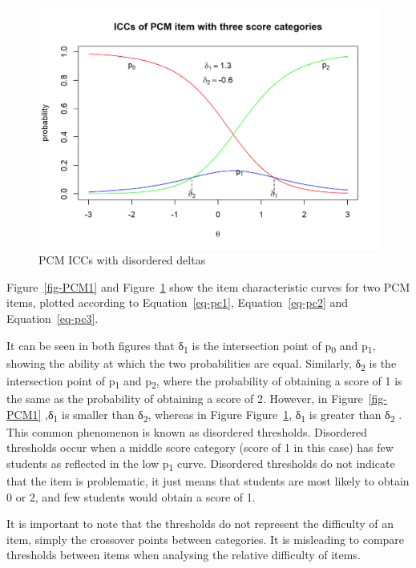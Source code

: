 \documentclass[
  letterpaper,
  DIV=11,
  numbers=noendperiod]{scrreprt}
\begin{document}
\begin{figure}

{\centering \includegraphics{images/PCM2-1.png}

}

\caption{\label{fig-PCM2}PCM ICCs with disordered deltas}

\end{figure}

Figure~\ref{fig-PCM1} and Figure~\ref{fig-PCM2} show the item
characteristic curves for two PCM items, plotted according to
Equation~\ref{eq-pc1}, Equation~\ref{eq-pc2} and Equation~\ref{eq-pc3}.

It can be seen in both figures that δ\textsubscript{1} is the
intersection point of p\textsubscript{0} and p\textsubscript{1}, showing
the ability at which the two probabilities are equal. Similarly,
δ\textsubscript{2} is the intersection point of p\textsubscript{1} and
p\textsubscript{2}, where the probability of obtaining a score of 1 is
the same as the probability of obtaining a score of 2. However, in
Figure~\ref{fig-PCM1} ,δ\textsubscript{1} is smaller than
δ\textsubscript{2}, whereas in Figure Figure~\ref{fig-PCM2},
δ\textsubscript{1} is greater than δ\textsubscript{2} . This common
phenomenon is known as disordered thresholds. Disordered thresholds
occur when a middle score category (score of 1 in this case) has few
students as reflected in the low p\textsubscript{1} curve. Disordered
thresholds do not indicate that the item is problematic, it just means
that students are most likely to obtain 0 or 2, and few students would
obtain a score of 1.

It is important to note that the thresholds do not represent the
difficulty of an item, simply the crossover points between categories.
It is misleading to compare thresholds between items when analysing the
relative difficulty of items.
\end{document}

